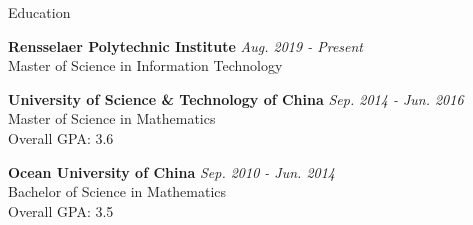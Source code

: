 \documentclass{resume} %
\begin{document}

\begin{rSection}{Education}

{\bf Rensselaer Polytechnic Institute} \hfill {\em Aug. 2019 - Present} 
\\ Master of Science in Information Technology

{\bf University of Science \& Technology of China} \hfill {\em  Sep. 2014 - Jun. 2016}
\\ Master of Science in Mathematics
\\ { Overall GPA: 3.6}

{\bf Ocean University of China} \hfill {\em  Sep. 2010 - Jun. 2014}
\\ Bachelor of Science in Mathematics
\\ { Overall GPA: 3.5}
\end{rSection}

\end{document}
